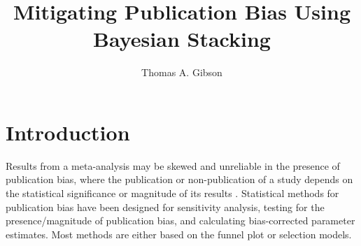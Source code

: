 \documentclass[12pt]{article}   	%
\title{Mitigating Publication Bias Using Bayesian Stacking}
\author{Thomas A. Gibson}
\numberwithin{equation}{section}
\begin{document}
\maketitle

\doublespacing
\nomarkersintext

\section{Introduction} \label{sec:intro}

Results from a meta-analysis may be skewed and unreliable in the presence of publication bias, where the publication or non-publication of a study depends on the statistical significance or magnitude of its results \citep{rothstein2006}. Statistical methods for publication bias have been designed for sensitivity analysis, testing for the presence/magnitude of publication bias, and calculating bias-corrected parameter estimates. Most methods are either based on the funnel plot or selection models.
\end{document}
